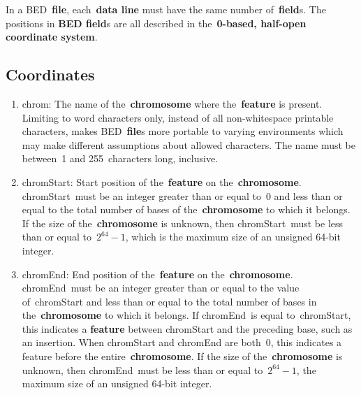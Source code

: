 \documentclass[11pt]{article}
\begin{document}
In a \ac{BED}~\textbf{file}, each~\textbf{data line} must have the same number of~\textbf{field}s.
The positions in \textbf{\acs{BED} field}s are all described in the~\textbf{0-based, half-open coordinate system}.

\subsection{Coordinates}
\begin{enumerate}
\item \textsf{chrom}: The name of the~\textbf{chromosome} where the~\textbf{feature} is present.
  Limiting to word characters only, instead of all non-whitespace printable characters, makes \ac{BED}~\textbf{file}s more portable to varying environments which may make different assumptions about allowed characters.
  The name must be between~1 and 255~characters long, inclusive.

\item \textsf{chromStart}: Start position of the~\textbf{feature} on the~\textbf{chromosome}.
  \textsf{chromStart}~must be an integer greater than or equal to~0 and less than or equal to the total number of bases of the~\textbf{chromosome} to which it belongs.
  If the size of the~\textbf{chromosome} is unknown, then \textsf{chromStart}~must be less than or equal to~$2^{64} - 1$, which is the maximum size of an unsigned 64-bit integer.

\item \textsf{chromEnd}: End position of the~\textbf{feature} on the~\textbf{chromosome}.
  \textsf{chromEnd}~must be an integer greater than or equal to the value of~\textsf{chromStart} and less than or equal to the total number of bases in the~\textbf{chromosome} to which it belongs.
  If \textsf{chromEnd}~is equal to~\textsf{chromStart}, this indicates a \textbf{feature} between \textsf{chromStart} and the preceding base, such as an insertion.
  When \textsf{chromStart} and \textsf{chromEnd} are both~0, this indicates a feature before the entire~\textbf{chromosome}.
  If the size of the~\textbf{chromosome} is unknown, then \textsf{chromEnd}~must be less than or equal to~$2^{64} - 1$, the maximum size of an unsigned 64-bit integer.
\end{enumerate}
\end{document}
